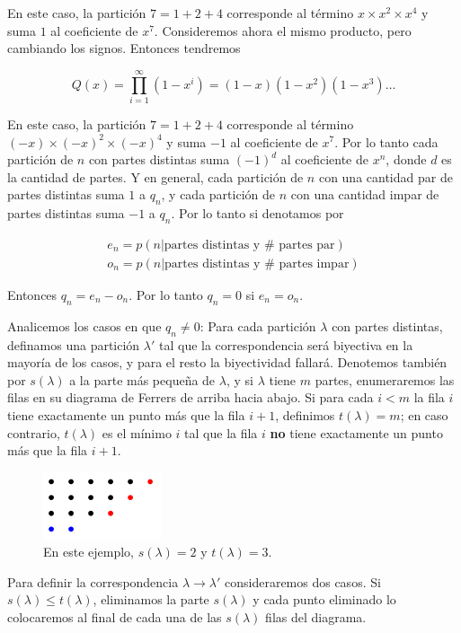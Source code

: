 En este caso, la partición $7 = 1 + 2 + 4$ corresponde al término $x \times x^2 \times x^4$ y suma $1$ al coeficiente de $x^7$. Consideremos ahora el mismo producto, pero cambiando los signos. Entonces tendremos

\[
Q(x) = \prod_{i=1}^{\infty} (1-x^i) = (1-x)(1-x^2)(1-x^3)\dots
\]

En este caso, la partición $7 = 1 + 2 + 4$ corresponde al término $(-x) \times (-x)^2 \times (-x)^4$ y suma $-1$ al coeficiente de $x^7$. Por lo tanto cada partición de $n$ con partes distintas suma $(-1)^d$ al coeficiente de $x^n$, donde $d$ es la cantidad de partes. Y en general, cada partición de $n$ con una cantidad par de partes distintas suma $1$ a $q_n$, y cada partición de $n$ con una cantidad impar de partes distintas suma $-1$ a $q_n$. Por lo tanto si denotamos por

\begin{gather*}
    e_n = p(n | \text{partes distintas y $\#$ partes par}) \\
    o_n = p(n | \text{partes distintas y $\#$ partes impar})
\end{gather*}

Entonces $q_n = e_n - o_n$. Por lo tanto $q_n = 0$ si $e_n = o_n$.

Analicemos los casos en que $q_n \neq 0$: Para cada partición $\lambda$ con partes distintas, definamos una partición $\lambda'$ tal que la correspondencia será biyectiva en la mayoría de los casos, y para el resto la biyectividad fallará. Denotemos también por $s(\lambda)$ a la parte más pequeña de $\lambda$, y si $\lambda$ tiene $m$ partes, enumeraremos las filas en su diagrama de Ferrers de arriba hacia abajo. Si para cada $i < m$ la fila $i$ tiene exactamente un punto más que la fila $i+1$, definimos $t(\lambda) = m$; en caso contrario, $t(\lambda)$ es el mínimo $i$ tal que la fila $i$ \textbf{no} tiene exactamente un punto más que la fila $i+1$.

\begin{figure}
    \centering
    \includegraphics[scale=0.65]{img/ferrers4.png}
    \caption{En este ejemplo, $s(\lambda) = 2$ y $t(\lambda) = 3$.}
    \label{fig:ferrers4}
\end{figure}

Para definir la correspondencia $\lambda \rightarrow \lambda'$ consideraremos dos casos. Si $s(\lambda) \leq t(\lambda)$, eliminamos la parte $s(\lambda)$ y cada punto eliminado lo colocaremos al final de cada una de las $s(\lambda)$ filas del diagrama.

